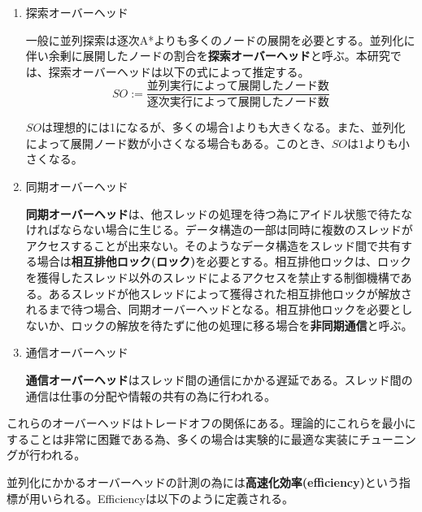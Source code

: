 \documentclass[uplatex]{jsarticle}
\begin{document}
\begin{enumerate}
\item 探索オーバーヘッド
\vspace{3mm}

一般に並列探索は逐次A*よりも多くのノードの展開を必要とする。並列化に伴い余剰に展開したノードの割合を\textbf{探索オーバーヘッド}と呼ぶ。本研究では、探索オーバーヘッドは以下の式によって推定する。
\newline
\begin{equation}
	SO := \frac{並列実行によって展開したノード数}{逐次実行によって展開したノード数}
\end{equation}


$SO$は理想的には1になるが、多くの場合1よりも大きくなる。また、並列化によって展開ノード数が小さくなる場合もある。このとき、$SO$は1よりも小さくなる。
\newline

\item 同期オーバーヘッド
\vspace{3mm}

\textbf{同期オーバーヘッド}は、他スレッドの処理を待つ為にアイドル状態で待たなければならない場合に生じる。データ構造の一部は同時に複数のスレッドがアクセスすることが出来ない。そのようなデータ構造をスレッド間で共有する場合は\textbf{相互排他ロック(ロック)}を必要とする。相互排他ロックは、ロックを獲得したスレッド以外のスレッドによるアクセスを禁止する制御機構である。あるスレッドが他スレッドによって獲得された相互排他ロックが解放されるまで待つ場合、同期オーバーヘッドとなる。相互排他ロックを必要としないか、ロックの解放を待たずに他の処理に移る場合を\textbf{非同期通信}と呼ぶ。
\newline

\item 通信オーバーヘッド
\vspace{3mm}

\textbf{通信オーバーヘッド}はスレッド間の通信にかかる遅延である。スレッド間の通信は仕事の分配や情報の共有の為に行われる。
\newline

\end{enumerate}

これらのオーバーヘッドはトレードオフの関係にある。理論的にこれらを最小にすることは非常に困難である為、多くの場合は実験的に最適な実装にチューニングが行われる。

並列化にかかるオーバーヘッドの計測の為には\textbf{高速化効率(efficiency)}という指標が用いられる。Efficiencyは以下のように定義される。
\end{document}
